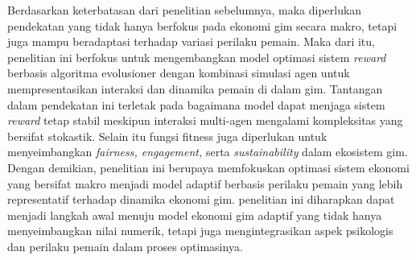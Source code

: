 Berdasarkan keterbatasan dari penelitian sebelumnya, maka diperlukan pendekatan yang tidak hanya berfokus pada ekonomi gim secara makro, tetapi juga mampu beradaptasi terhadap variasi perilaku pemain. Maka dari itu, penelitian ini berfokus untuk mengembangkan model optimasi sistem \textit{reward} berbasis algoritma evolusioner dengan kombinasi simulasi agen untuk mempresentasikan interaksi dan dinamika pemain di dalam gim. Tantangan dalam pendekatan ini terletak pada bagaimana model dapat menjaga sistem \textit{reward} tetap stabil meskipun interaksi multi-agen mengalami kompleksitas yang bersifat stokastik. Selain itu fungsi fitness juga diperlukan untuk menyeimbangkan \textit{fairness, engagement,} serta \textit{sustainability} dalam ekosistem gim. Dengan demikian, penelitian ini berupaya memfokuskan optimasi sistem ekonomi yang bersifat makro menjadi model adaptif berbasis perilaku pemain yang lebih representatif terhadap dinamika ekonomi gim. penelitian ini diharapkan dapat menjadi langkah awal menuju model ekonomi gim adaptif yang tidak hanya menyeimbangkan nilai numerik, tetapi juga mengintegrasikan aspek psikologis dan perilaku pemain dalam proses optimasinya.



